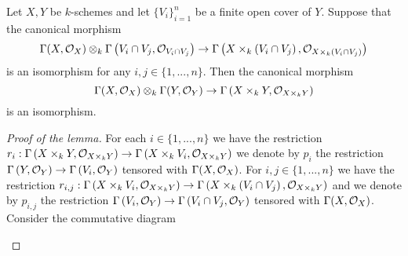 \begin{lemma}\label{lemma:regular_functions_and_open_covers_of_a_factor}
Let $X,Y$ be $k$-schemes and let $\{V_i\}_{i=1}^n$ be a finite open cover of $Y$. Suppose that the canonical morphism
$$\Gamma(X,{\mathcal O}_X)\otimes_k\Gamma\left(V_i\cap V_j,{\mathcal O}_{V_i \cap V_j}\right) \rightarrow \Gamma\left( X \times_k \left(V_i\cap V_j\right),{\mathcal O}_{X\times_k\left(V_i \cap V_j\right)}\right)$$
is an isomorphism for any $i,j\in \{1,...,n\}$. Then the canonical morphism
$$\Gamma(X,{\mathcal O}_X)\otimes_k\Gamma(Y,{\mathcal O}_Y) \rightarrow \Gamma\left(X\times_kY,{\mathcal O}_{X\times_kY}\right)$$
is an isomorphism.
\end{lemma}
\begin{proof}[Proof of the lemma]
For each $i\in \{1,...,n\}$ we have the restriction $r_i:\Gamma\left(X \times_kY,{\mathcal O}_{X \times_kY}\right)\rightarrow \Gamma\left(X\times_kV_i,{\mathcal O}_{X\times_kY}\right)$ we denote by $p_i$ the restriction $\Gamma\left(Y,{\mathcal O}_{Y}\right)\rightarrow \Gamma\left(V_i,{\mathcal O}_{Y}\right)$ tensored with $\Gamma(X,{\mathcal O}_X)$. For $i, j \in \{1,...,n\}$ we have the restriction $r_{i,j}:\Gamma\left(X \times_kV_i,{\mathcal O}_{X \times_kY}\right)\rightarrow \Gamma\left(X\times_k\left(V_i\cap V_j\right),{\mathcal O}_{X\times_kY}\right)$ and we denote by $p_{i,j}$ the restriction $\Gamma\left(V_i,{\mathcal O}_{Y}\right)\rightarrow \Gamma\left(V_i\cap V_j ,{\mathcal O}_{Y}\right)$ tensored with $\Gamma(X,{\mathcal O}_X)$. Consider the commutative diagram
\begin{center}
\hspace*{-1.5cm}
\end{center}
\end{proof}
